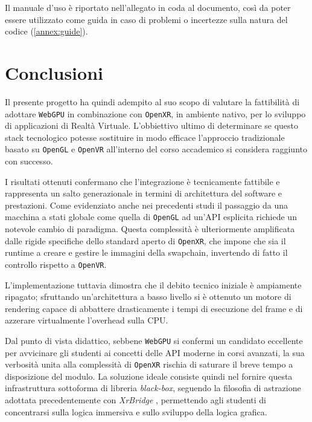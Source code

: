 \documentclass[a4paper, 11pt, twoside]{report}
\newif\ifshowlogo
\newcommand{\blankpage}{
    \clearpage
    \thispagestyle{empty}     %
    \showlogofalse            %
    \hbox{}                   %
    \newpage
    \showlogotrue             %
}
\begin{document}
Il manuale d'uso è riportato nell'allegato in coda al documento, così da poter essere utilizzato come guida in caso
di problemi o incertezze sulla natura del codice (\ref{annex:guide}).

\blankpage

\chapter{Conclusioni}

Il presente progetto ha quindi adempito al suo scopo di valutare la fattibilità di adottare \texttt{WebGPU} in
combinazione con \texttt{\gls{OpenXR}}, in ambiente nativo, per lo sviluppo di applicazioni di Realtà Virtuale.
L'obbiettivo ultimo di determinare se questo stack tecnologico potesse sostituire in modo efficace l'approccio
tradizionale basato su \texttt{OpenGL} e \texttt{OpenVR} all'interno del corso accademico si considera raggiunto con
successo.

I risultati ottenuti confermano che l'integrazione è tecnicamente fattibile e rappresenta un salto generazionale in
termini di architettura del software e prestazioni. Come evidenziato anche nei precedenti studi \cite{Forestieri_2025}
il passaggio da una macchina a stati globale come quella di \texttt{OpenGL} ad un'API esplicita richiede un notevole
cambio di paradigma. Questa complessità è ulteriormente amplificata dalle rigide specifiche dello standard aperto di
\texttt{\gls{OpenXR}}, che impone che sia il runtime a creare e gestire le immagini della swapchain, invertendo di fatto
il controllo rispetto a \texttt{\gls{OpenVR}}.

L'implementazione tuttavia dimostra che il debito tecnico iniziale è ampiamente ripagato; sfruttando un'architettura a
basso livello si è ottenuto un motore di rendering capace di abbattere drasticamente i tempi di esecuzione del frame
e di azzerare virtualmente l'overhead sulla CPU.

Dal punto di vista didattico, sebbene \texttt{WebGPU} si confermi un candidato eccellente per avvicinare gli studenti ai
concetti delle API moderne in corsi avanzati, la sua verbosità unita alla complessità di \texttt{\gls{OpenXR}} rischia
di saturare il breve tempo a disposizione del modulo. La soluzione ideale consiste quindi nel fornire questa
infrastruttura sottoforma di libreria \textit{black-box}, seguendo la filosofia di astrazione adottata precedentemente
con \textit{XrBridge} \cite{Piazza_2024}, permettendo agli studenti di concentrarsi sulla logica immersiva e sullo
sviluppo della logica grafica.
\end{document}
